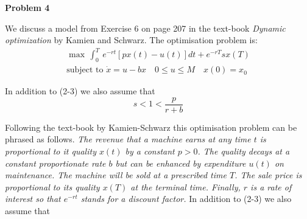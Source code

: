 \documentclass{amsart}
\begin{document}
\bigskip



\centerline{\bf\large Problem 4} 
\bigskip

\noindent
We discuss a model from Exercise 6 on page 207
in the text-book 
\emph{Dynamic optimization} by Kamien and Schwarz. The optimisation problem is:
\begin{align*}
\max\,\int_0^T\, e^{-rt}[px(t)-u(t)]dt+e^{-rT}sx(T)\\
\text{subject to}\,\, \dot x=u-bx\quad 0\leq u\leq M\quad x(0)=x_0
\end{align*}
\medskip

\noindent
In addition to (2-3)
we also assume that
\[
s<1<\frac{p}{r+b}
\]

\noindent
Following the text-book by Kamien-Schwarz  this optimisation 
problem can be phrased as follows. \emph{The revenue that a machine earns at any time $t$ is proportional to it quality $x(t)$ by a 
constant $p>0$. The quality decays at a constant proportionate rate $b$ but can
be enhanced by expenditure $u(t)$ on maintenance. The machine will
be sold at a prescribed time $T$. The sale price is proportional to its quality
$x(T)$ at the terminal time. Finally, $r$ is a rate of interest so that
$e^{-rt}$ stands for a discount factor.} 
In addition to (2-3)
we also assume that
\medskip
\end{document}
